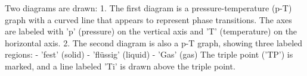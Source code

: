 Two diagrams are drawn:  
1. The first diagram is a pressure-temperature (p-T) graph with a curved line that appears to represent phase transitions. The axes are labeled with 'p' (pressure) on the vertical axis and 'T' (temperature) on the horizontal axis.  
2. The second diagram is also a p-T graph, showing three labeled regions:  
   - 'fest' (solid)  
   - 'flüssig' (liquid)  
   - 'Gas' (gas)  
   The triple point ('TP') is marked, and a line labeled 'Ti' is drawn above the triple point.